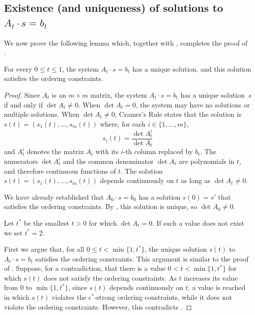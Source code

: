 \subsection{Existence (and uniqueness) of solutions to $A_t\cdot s=b_t$}

We now prove the following lemma which, together with , completes the proof of .

\begin{lem}
	For every $0\le t\le 1$, the system $A_t\cdot s=b_t$ has a unique solution,
	and this solution satisfies the ordering constraints. %
\end{lem}

\begin{proof}
	Since $A_t$ is an $m\times m$ matrix, the system $A_t\cdot
	s=b_t$ has a unique solution~$s$ if and only if $\det A_t \neq 0$.
	When $\det A_t =0$, the system may have no solutions or
	multiple solutions.  
	When $\det A_t\neq 0$, 
	Cramer's Rule states that
	the solution
	is $s(t)=(s_1(t),\ldots,s_m(t))$ where, for each
	$i\in\{1,\ldots,m\}$,
	\[ 
	s_i(t) = \frac{\det A_t^i}{\det A_t }
	\]
	and $A_t^i$ denotes the matrix $A_t$ with its $i$-th column replaced
	by $b_t$. 
	The numerators $\det A_t^i$ and the common
	denominator $\det A_t $ are polynomials in $t$, and therefore
	continuous
	functions of $t$.
	The solution $s(t)=(s_1(t),\ldots,s_m(t))$ depends continuously on $t$
	as long as  $\det A_t\ne0 $.
	
	We have already established that $A_0\cdot s=b_0$ has a
	solution $s(0)=s'$ that satisfies the ordering constraints. By
	, this solution is unique, so $\det A_0\neq 0$.
	
	Let $t^*$ be the smallest $t>0$
	for which 
	$\det A_{t}= 0$. If such a value does not exist we set $t^*=2$.
	
	First we argue that, for all $0\le t <\min \{1,t^*\}$, the unique solution $s(t)$ to $A_t\cdot s=b_t$ satisfies the ordering constraints. This argument is similar to the proof of . Suppose, for a contradiction, that there is a value $0<t<\min\{1,t^*\}$ for which $s(t)$ does not satisfy the ordering constraints. As $t$ increases its value from $0$ to $\min\{1,t^*\}$, since $s(t)$ depends continuously on $t$, a value is reached in which $s(t)$ violates the $\epsilon^*$-strong ordering constraints, while it does not violate the ordering constraints. However, this contradicts	.
	

\end{proof}
